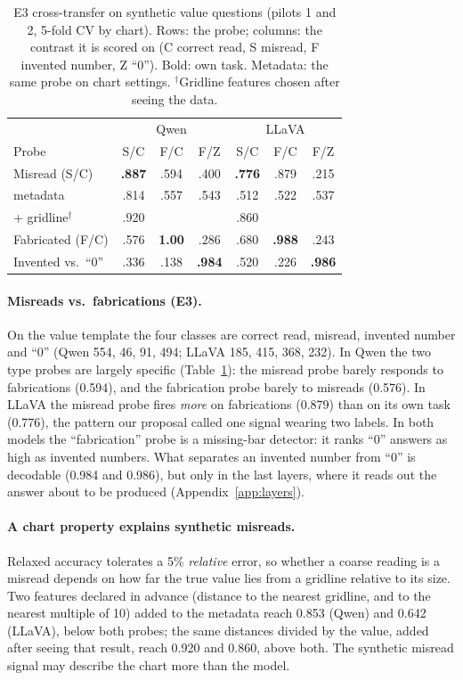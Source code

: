 \begin{table}[t]
\centering\small\setlength{\tabcolsep}{2.5pt}
\begin{tabular}{lcccccc}
\toprule
 & \multicolumn{3}{c}{Qwen} & \multicolumn{3}{c}{LLaVA} \\
Probe & S/C & F/C & F/Z & S/C & F/C & F/Z \\
\midrule
Misread (S/C) & \textbf{.887} & .594 & .400 & \textbf{.776} & .879 & .215 \\
\quad metadata & .814 & .557 & .543 & .512 & .522 & .537 \\
\quad + gridline$^\dagger$ & .920 & & & .860 & & \\
Fabricated (F/C) & .576 & \textbf{1.00} & .286 & .680 & \textbf{.988} & .243 \\
Invented vs.\ ``0'' & .336 & .138 & \textbf{.984} & .520 & .226 & \textbf{.986} \\
\bottomrule
\end{tabular}
\caption{E3 cross-transfer on synthetic value questions (pilots 1 and 2, 5-fold
CV by chart). Rows: the probe; columns: the contrast it is scored on (C correct
read, S misread, F invented number, Z ``0''). Bold: own task. Metadata: the
same probe on chart settings. $^\dagger$Gridline features chosen after seeing
the data.}
\label{tab:matrix}
\end{table}

\paragraph{Misreads vs.\ fabrications (E3).} On the value template the four
classes are correct read, misread, invented number and ``0'' (Qwen 554, 46, 91,
494; LLaVA 185, 415, 368, 232). In Qwen the two type probes are largely specific
(Table~\ref{tab:matrix}): the misread probe barely responds to fabrications
(0.594), and the fabrication probe barely to misreads (0.576). In LLaVA the
misread probe fires \emph{more} on fabrications (0.879) than on its own task
(0.776), the pattern our proposal called one signal wearing two labels. In both
models the ``fabrication'' probe is a missing-bar detector: it ranks ``0'' answers
as high as invented numbers. What separates an invented number from ``0'' is
decodable (0.984 and 0.986), but only in the last layers, where it reads out the
answer about to be produced (Appendix~\ref{app:layers}).

\paragraph{A chart property explains synthetic misreads.} Relaxed accuracy
tolerates a 5\% \emph{relative} error, so whether a coarse reading is a misread
depends on how far the true value lies from a gridline relative to its size. Two
features declared in advance (distance to the nearest gridline, and to the
nearest multiple of 10) added to the metadata reach 0.853 (Qwen) and 0.642
(LLaVA), below both probes; the same distances divided by the value, added after
seeing that result, reach 0.920 and 0.860, above both. The synthetic misread
signal may describe the chart more than the model.

